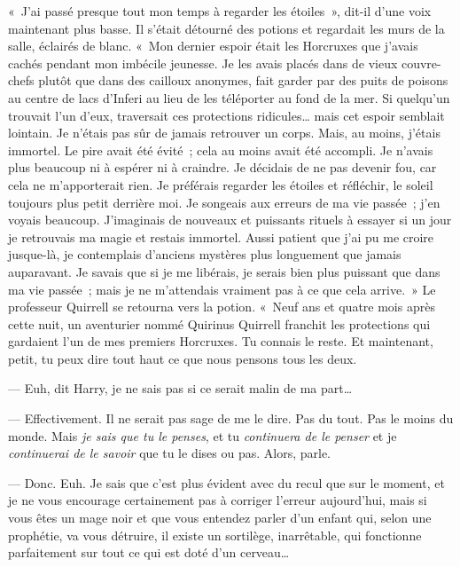 «~J'ai passé presque tout mon temps à regarder les étoiles~», dit-il d'une voix maintenant plus basse. Il s'était détourné des potions et regardait les murs de la salle, éclairés de blanc. «~Mon dernier espoir était les Horcruxes que j'avais cachés pendant mon imbécile jeunesse. Je les avais placés dans de vieux couvre-chefs plutôt que dans des cailloux anonymes, fait garder par des puits de poisons au centre de lacs d'Inferi au lieu de les téléporter au fond de la mer. Si quelqu'un trouvait l'un d'eux, traversait ces protections ridicules… mais cet espoir semblait lointain. Je n'étais pas sûr de jamais retrouver un corps. Mais, au moins, j'étais immortel. Le pire avait été évité~; cela au moins avait été accompli. Je n'avais plus beaucoup ni à espérer ni à craindre. Je décidais de ne pas devenir fou, car cela ne m'apporterait rien. Je préférais regarder les étoiles et réfléchir, le soleil toujours plus petit derrière moi. Je songeais aux erreurs de ma vie passée~; j'en voyais beaucoup. J'imaginais de nouveaux et puissants rituels à essayer si un jour je retrouvais ma magie et restais immortel. Aussi patient que j'ai pu me croire jusque-là, je contemplais d'anciens mystères plus longuement que jamais auparavant. Je savais que si je me libérais, je serais bien plus puissant que dans ma vie passée~; mais je ne m'attendais vraiment pas à ce que cela arrive.~» Le professeur Quirrell se retourna vers la potion. «~Neuf ans et quatre mois après cette nuit, un aventurier nommé Quirinus Quirrell franchit les protections qui gardaient l'un de mes premiers Horcruxes. Tu connais le reste. Et maintenant, petit, tu peux dire tout haut ce que nous pensons tous les deux.

--- Euh, dit Harry, je ne sais pas si ce serait malin de ma part…

--- Effectivement. Il ne serait pas sage de me le dire. Pas du tout. Pas le moins du monde. Mais \emph{je sais que tu le penses}, et tu \emph{continuera de le penser} et je \emph{continuerai de le savoir} que tu le dises ou pas. Alors, parle.

--- Donc. Euh. Je sais que c'est plus évident avec du recul que sur le moment, et je ne vous encourage certainement pas à corriger l'erreur aujourd'hui, mais si vous êtes un mage noir et que vous entendez parler d'un enfant qui, selon une prophétie, va vous détruire, il existe un sortilège, inarrêtable, qui fonctionne parfaitement sur tout ce qui est doté d'un cerveau…

